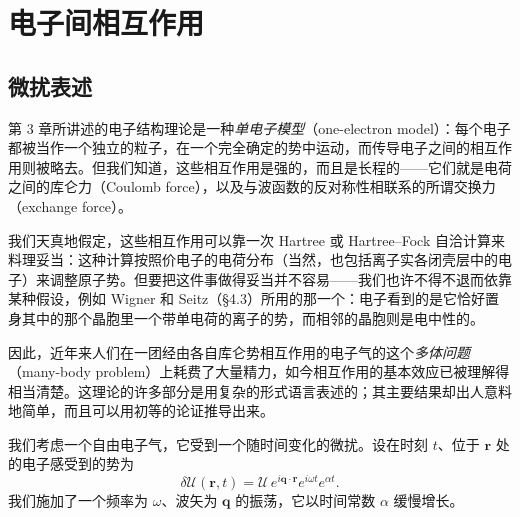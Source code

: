 
\chapter{电子间相互作用}


\section{微扰表述}

第 3 章所讲述的电子结构理论是一种\emph{单电子模型}（one-electron model）：每个电子都被当作一个独立的粒子，在一个完全确定的势中运动，而传导电子之间的相互作用则被略去。但我们知道，这些相互作用是强的，而且是长程的——它们就是电荷之间的库仑力（Coulomb force），以及与波函数的反对称性相联系的所谓交换力（exchange force）。

我们天真地假定，这些相互作用可以靠一次 Hartree 或 Hartree--Fock 自洽计算来料理妥当：这种计算按照价电子的电荷分布（当然，也包括离子实各闭壳层中的电子）来调整原子势。但要把这件事做得妥当并不容易——我们也许不得不退而依靠某种假设，例如 Wigner 和 Seitz（§4.3）所用的那一个：电子看到的是它恰好置身其中的那个晶胞里一个带单电荷的离子的势，而相邻的晶胞则是电中性的。

因此，近年来人们在一团经由各自库仑势相互作用的电子气的这个\emph{多体问题}（many-body problem）上耗费了大量精力，如今相互作用的基本效应已被理解得相当清楚。这理论的许多部分是用复杂的形式语言表述的；其主要结果却出人意料地简单，而且可以用初等的论证推导出来。

我们考虑一个自由电子气，它受到一个随时间变化的微扰。设在时刻 $t$、位于 $\mathbf{r}$ 处的电子感受到的势为
\begin{equation*}
\delta\mathcal{U}(\mathbf{r},t)=\mathcal{U}\,e^{i\mathbf{q}\cdot\mathbf{r}}e^{i\omega t}e^{\alpha t}.
\tag{5.1}
\end{equation*}
我们施加了一个频率为 $\omega$、波矢为 $\mathbf{q}$ 的振荡，它以时间常数 $\alpha$ 缓慢增长。

